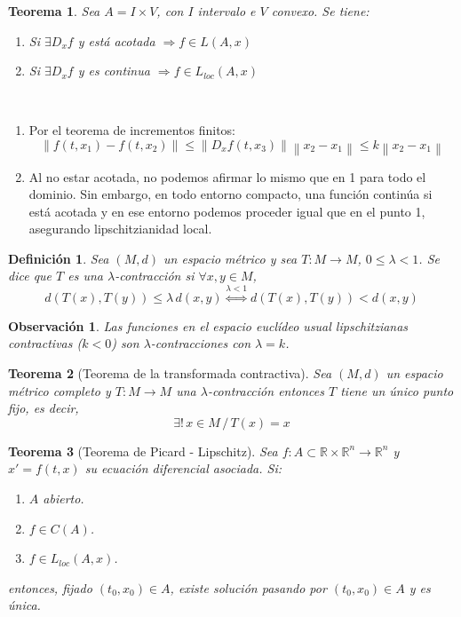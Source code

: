 \documentclass[11pt, a4paper,twoside]{article}
\makeatletter
\newcommand{\iindex}[1]{\emph{#1}\index{#1}}
\theoremstyle{theorem-style}  %
\newtheorem{theorem}{Teorema}[section]  %
\renewenvironment{proof}[1][\proofname]{\par
	\pushQED{\qed}%
	\normalfont \topsep6\p@\@plus6\p@\relax
	\list{}{%
		\settowidth{\leftmargin}{\quad:\hskip\labelsep}%
		\setlength{\labelwidth}{0pt}%
		\setlength{\itemindent}{-\leftmargin}%
	}%
	\item[\hskip\labelsep\itshape#1\@addpunct{:}]\ignorespaces
}{%
	\popQED\endlist\@endpefalse
}
\theoremstyle{definition-style}
\newtheorem{definition}{Definición}[section]
\newtheorem*{observation}{Observación} %
\theoremstyle{example-style}
\providecommand{\norm}[1]{\left\lVert#1\right\rVert} %
\makeatother
\begin{document}
\begin{theorem}\label{lloc_suf}
	Sea $A = I \times V$, con $I$ intervalo e $V$ convexo. Se tiene:
	\begin{enumerate}
		\item Si $\exists D_x f$ y está acotada $\Rightarrow f \in L(A, x)$
		\item Si $\exists D_x f$ y es continua $\Rightarrow f \in L_{loc}(A, x)$
	\end{enumerate}
\end{theorem}
\begin{proof}\ 
	\begin{enumerate}
		\item Por el teorema de incrementos finitos:
		\[\norm{f(t, x_1) - f(t, x_2)} \leq \norm{D_xf(t, x_3)} \norm{x_2 - x_1} \leq k\norm{x_2 - x_1}\]
		\item Al no estar acotada, no podemos afirmar lo mismo que en 1 para todo el dominio. Sin embargo, en todo entorno compacto, una función continúa si está acotada y en ese entorno podemos proceder igual que en el punto 1, asegurando lipschitzianidad local.
	\end{enumerate}
\end{proof}
\begin{definition}
	Sea $(M, d)$ un espacio métrico y sea $T: M \longrightarrow M$, $0 \leq \lambda < 1$. Se dice que $T$ es una \iindex{$\lambda$-contracción} si $\forall x, y \in M$, 
	\[d(T(x), T(y)) \leq \lambda \, d(x, y) \stackrel{\lambda < 1}{\Leftrightarrow} d(T(x), T(y)) < d(x, y)\]
\end{definition}
\begin{observation}
	Las funciones en el espacio euclídeo usual lipschitzianas contractivas ($ k<0 $) son $\lambda$-contracciones con $ \lambda=k $.
\end{observation}
\begin{theorem}[Teorema de la transformada contractiva]\label{transformada}
	Sea $(M, d)$ un espacio métrico completo y $T: M \longrightarrow M$ una $\lambda$-contracción entonces $T$ tiene un único punto fijo, es decir,
	\[\exists! \, x \in M \,/\, T(x) = x\]
\end{theorem}
\begin{theorem}[Teorema de Picard - Lipschitz] \label{picard}
	Sea $f : A \subset \mathbb{R} \times \mathbb{R}^n \longrightarrow \mathbb{R}^n$ y $x' = f(t, x)$ su ecuación diferencial asociada. Si:
	\begin{enumerate}[\quad i)]
		\item $A$ abierto.
		\item $f \in C(A)$.
		\item $f \in L_{loc} (A, x)$.
	\end{enumerate}
	entonces, fijado $(t_0, x_0) \in A$, existe solución pasando por $(t_0, x_0) \in A$ y es única.
\end{theorem}
\end{document}
